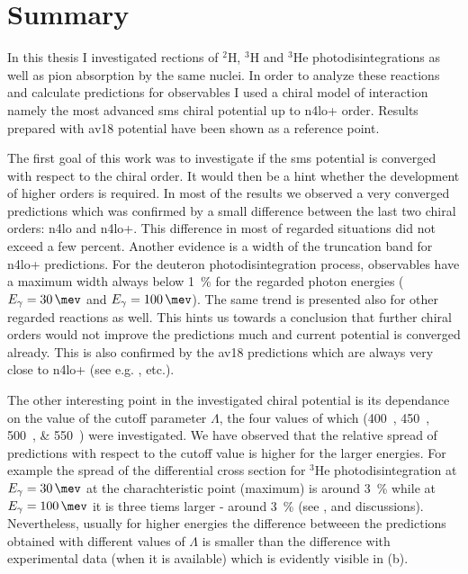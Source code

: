 \chapter{Summary}

In this thesis I investigated rections of $^2$H, $^3$H and $^3$He photodisintegrations
as well as pion absorption by the same nuclei. In order to analyze these reactions
and calculate predictions for observables I used a chiral model of interaction
namely the most advanced \gls{sms} chiral potential up to \gls{n4lo+} order.
Results prepared with \gls{av18} potential have been shown as 
a reference point.

The first goal of this work was to investigate if the \gls{sms}
potential is converged with respect to the chiral order. It would then be
a hint whether the development of higher orders is required. In most of the results
we observed a very converged predictions which was confirmed by a small difference
between the last two chiral orders: \gls{n4lo} and \gls{n4lo+}. This
difference in most of regarded situations did not exceed a few percent.
Another evidence is a width of the truncation band for \gls{n4lo+} predictions.
For the deuteron photodisintegration process, observables have a maximum
width always below \SI{1}{\percent} for the regarded photon energies
($E_\gamma=\SI{30}{\mev}$ and $E_\gamma=\SI{100}{\mev}$).
The same trend is presented also for other regarded reactions as well.
This hints us towards a conclusion that further chiral orders would not
improve the predictions much and current potential is converged already.
This is also confirmed by the \gls{av18} predictions which are
always very close to \gls{n4lo+} (see e.g. ,  etc.).

The other interesting point in the investigated chiral potential is its dependance
on the value of the cutoff parameter $\Lambda$, the four values of which (\SIlist[list-units = single]{400;450;500;550}{\mev}) 
were investigated. We have observed that the relative spread of predictions 
with respect to the cutoff value is higher for the larger energies.
For example the spread of the differential cross section for $^3$He photodisintegration
at $E_\gamma=\SI{30}{\mev}$ at the charachteristic point (maximum) is around \SI{3}{\percent}
while at $E_\gamma=\SI{100}{\mev}$ it is three tiems larger - around \SI{3}{\percent}
(see ,  and discussions).
Nevertheless, usually for higher energies the difference betweeen the predictions
obtained with different values of $\Lambda$ is smaller than the difference with experimental
data (when it is available) which is evidently visible in (b).

